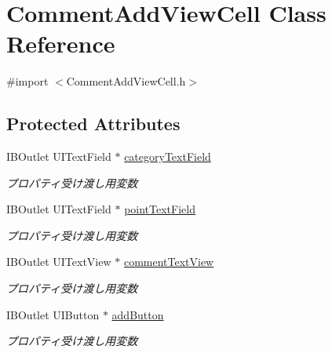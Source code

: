 \hypertarget{interface_comment_add_view_cell}{
\section{CommentAddViewCell Class Reference}
\label{interface_comment_add_view_cell}
}


{\ttfamily \#import $<$CommentAddViewCell.h$>$}

\subsection*{Protected Attributes}
\begin{DoxyCompactItemize}
\item 
\hypertarget{interface_comment_add_view_cell_aae3002da709f2016646fac4d2bc4e1c9}{
IBOutlet UITextField $\ast$ \hyperlink{interface_comment_add_view_cell_aae3002da709f2016646fac4d2bc4e1c9}{categoryTextField}}
\label{interface_comment_add_view_cell_aae3002da709f2016646fac4d2bc4e1c9}

\begin{DoxyCompactList}\small\item\em プロパティ受け渡し用変数 \end{DoxyCompactList}\item 
\hypertarget{interface_comment_add_view_cell_a85c71177f9a45d87c5ca7bf339322261}{
IBOutlet UITextField $\ast$ \hyperlink{interface_comment_add_view_cell_a85c71177f9a45d87c5ca7bf339322261}{pointTextField}}
\label{interface_comment_add_view_cell_a85c71177f9a45d87c5ca7bf339322261}

\begin{DoxyCompactList}\small\item\em プロパティ受け渡し用変数 \end{DoxyCompactList}\item 
\hypertarget{interface_comment_add_view_cell_a697f2b062a2f518c84ea0b5918b128cf}{
IBOutlet UITextView $\ast$ \hyperlink{interface_comment_add_view_cell_a697f2b062a2f518c84ea0b5918b128cf}{commentTextView}}
\label{interface_comment_add_view_cell_a697f2b062a2f518c84ea0b5918b128cf}

\begin{DoxyCompactList}\small\item\em プロパティ受け渡し用変数 \end{DoxyCompactList}\item 
\hypertarget{interface_comment_add_view_cell_a8580625445c9600ce790241aa5dae778}{
IBOutlet UIButton $\ast$ \hyperlink{interface_comment_add_view_cell_a8580625445c9600ce790241aa5dae778}{addButton}}
\label{interface_comment_add_view_cell_a8580625445c9600ce790241aa5dae778}

\begin{DoxyCompactList}\small\item\em プロパティ受け渡し用変数 \end{DoxyCompactList}\end{DoxyCompactItemize}

